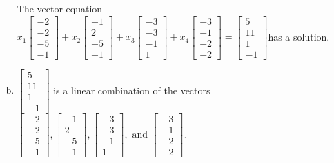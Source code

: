 \begin{exerciseAnswer}
\begin{enumerate}[(a)]
\begin{center}
\begin{minipage}{0.8\textwidth}
 The vector equation \( x_{1} \left[\begin{array}{c}
-2 \\
-2 \\
-5 \\
-1
\end{array}\right] + x_{2} \left[\begin{array}{c}
-1 \\
2 \\
-5 \\
-1
\end{array}\right] + x_{3} \left[\begin{array}{c}
-3 \\
-3 \\
-1 \\
1
\end{array}\right] + x_{4} \left[\begin{array}{c}
-3 \\
-1 \\
-2 \\
-2
\end{array}\right] = \left[\begin{array}{c}
5 \\
11 \\
1 \\
-1
\end{array}\right] \)has a solution.
\end{minipage}\end{center}
    
\item 

\( \left[\begin{array}{c}
5 \\
11 \\
1 \\
-1
\end{array}\right] \) is a linear combination of the vectors \( \left[\begin{array}{c}
-2 \\
-2 \\
-5 \\
-1
\end{array}\right] , \left[\begin{array}{c}
-1 \\
2 \\
-5 \\
-1
\end{array}\right] , \left[\begin{array}{c}
-3 \\
-3 \\
-1 \\
1
\end{array}\right] , \text{ and } \left[\begin{array}{c}
-3 \\
-1 \\
-2 \\
-2
\end{array}\right] \). 


\end{enumerate}
    
\end{exerciseAnswer}
    
